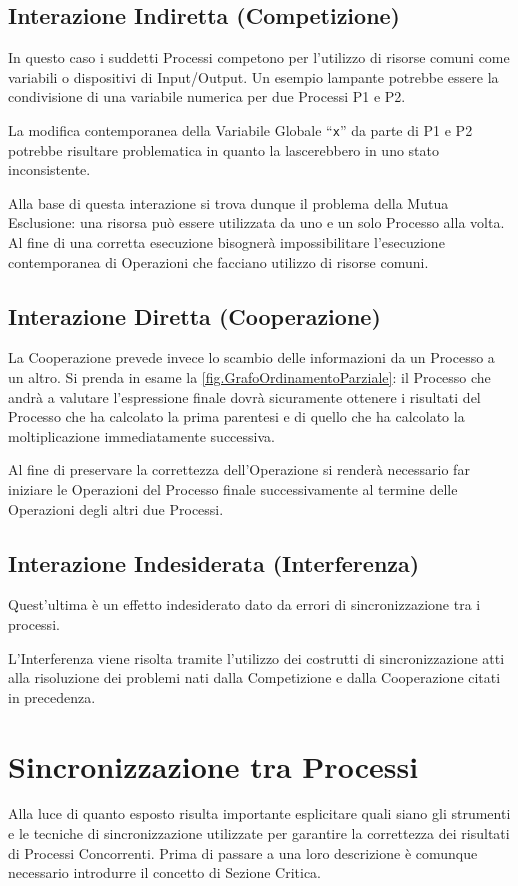 \subsection{Interazione Indiretta (Competizione)}
In questo caso i suddetti Processi competono per l'utilizzo di risorse comuni come variabili o dispositivi di Input/Output. Un esempio lampante potrebbe essere la condivisione di una variabile numerica per due Processi P1 e P2.

La modifica contemporanea della Variabile Globale ``\texttt{x}'' da parte di P1 e P2 potrebbe risultare problematica in quanto la lascerebbero in uno stato inconsistente. \par
Alla base di questa interazione si trova dunque il problema della Mutua Esclusione: una risorsa può essere utilizzata da uno e un solo Processo alla volta. Al fine di una corretta esecuzione bisognerà impossibilitare l'esecuzione contemporanea di Operazioni che facciano utilizzo di risorse comuni.
\subsection{Interazione Diretta (Cooperazione)}
La Cooperazione prevede invece lo scambio delle informazioni da un Processo a un altro. Si prenda in esame la \autoref{fig.GrafoOrdinamentoParziale}: il Processo che andrà a valutare l'espressione finale dovrà sicuramente ottenere i risultati del Processo che ha calcolato la prima parentesi e di quello che ha calcolato la moltiplicazione immediatamente successiva. \par
Al fine di preservare la correttezza dell'Operazione si renderà necessario far iniziare le Operazioni del Processo finale successivamente al termine delle Operazioni degli altri due Processi.
\subsection{Interazione Indesiderata (Interferenza)}
Quest'ultima è un effetto indesiderato dato da errori di sincronizzazione tra i processi. \par
L'Interferenza viene risolta tramite l'utilizzo dei costrutti di sincronizzazione atti alla risoluzione dei problemi nati dalla Competizione e dalla Cooperazione citati in precedenza.

\section{Sincronizzazione tra Processi}
Alla luce di quanto esposto risulta importante esplicitare quali siano gli strumenti e le tecniche di sincronizzazione utilizzate per garantire la correttezza dei risultati di Processi Concorrenti. Prima di passare a una loro descrizione è comunque necessario introdurre il concetto di Sezione Critica.
